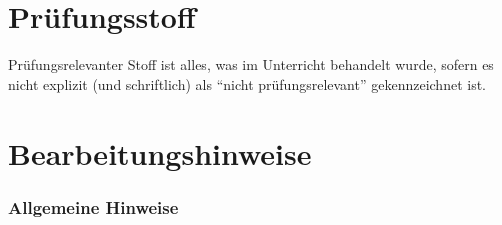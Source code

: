 \documentclass[
  a4paper,
  DIV=11]{scrreprt}
\theoremstyle{definition}
\theoremstyle{remark}
\begin{document}
\hypertarget{pruxfcfungsstoff}{%
\section{Prüfungsstoff}\label{pruxfcfungsstoff}}

Prüfungsrelevanter Stoff ist alles, was im Unterricht behandelt wurde,
sofern es nicht explizit (und schriftlich) als ``nicht
prüfungsrelevant'' gekennzeichnet ist.

\hypertarget{bearbeitungshinweise}{%
\section{Bearbeitungshinweise}\label{bearbeitungshinweise}}

\hypertarget{allgemeine-hinweise}{%
\subsubsection{Allgemeine Hinweise}\label{allgemeine-hinweise}}
\end{document}
